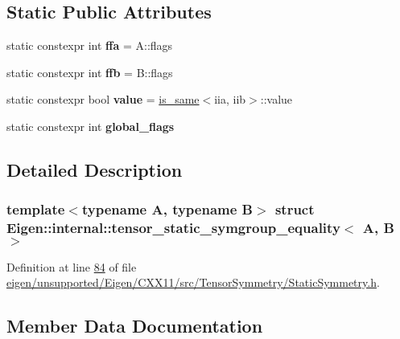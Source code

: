\subsection*{Static Public Attributes}
\begin{DoxyCompactItemize}
\item 
\mbox{\label{struct_eigen_1_1internal_1_1tensor__static__symgroup__equality_aec40ee91b9e7c0ddd355f924616f327f}} 
static constexpr int {\bfseries ffa} = A\+::flags
\item 
\mbox{\label{struct_eigen_1_1internal_1_1tensor__static__symgroup__equality_aaba067f3fb0fef69bf99320d5d7692d1}} 
static constexpr int {\bfseries ffb} = B\+::flags
\item 
\mbox{\label{struct_eigen_1_1internal_1_1tensor__static__symgroup__equality_a15baecf12881fb51dd4f5632f46427c3}} 
static constexpr bool {\bfseries value} = \hyperlink{struct_eigen_1_1internal_1_1is__same}{is\+\_\+same}$<$iia, iib$>$\+::value
\item 
static constexpr int {\bfseries global\+\_\+flags}
\end{DoxyCompactItemize}


\subsection{Detailed Description}
\subsubsection*{template$<$typename A, typename B$>$\newline
struct Eigen\+::internal\+::tensor\+\_\+static\+\_\+symgroup\+\_\+equality$<$ A, B $>$}



Definition at line \hyperlink{eigen_2unsupported_2_eigen_2_c_x_x11_2src_2_tensor_symmetry_2_static_symmetry_8h_source_l00084}{84} of file \hyperlink{eigen_2unsupported_2_eigen_2_c_x_x11_2src_2_tensor_symmetry_2_static_symmetry_8h_source}{eigen/unsupported/\+Eigen/\+C\+X\+X11/src/\+Tensor\+Symmetry/\+Static\+Symmetry.\+h}.



\subsection{Member Data Documentation}
\mbox{\label{struct_eigen_1_1internal_1_1tensor__static__symgroup__equality_ad8912db89eca6f2192c26679e0d50072}} 
